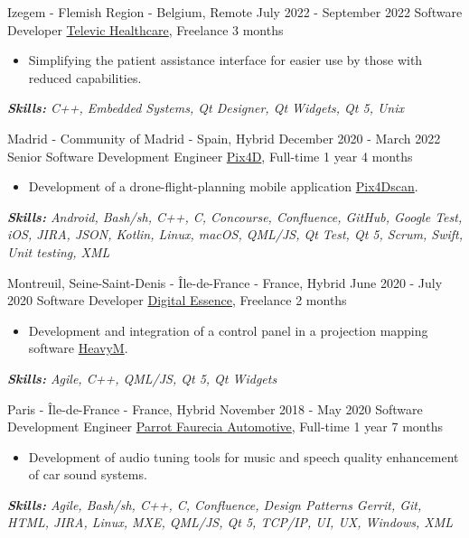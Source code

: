 \documentclass[11pt,a4paper,roman]{moderncv}
\begin{document}
\cventry
{Izegem - Flemish Region - Belgium, Remote}
{July 2022 - September 2022}
{Software Developer}
{\href{https://www.televic.com/en/healthcare}{Televic Healthcare}, Freelance}
{3 months}
{}
{
\begin{itemize}
	\item Simplifying the patient assistance interface for easier use by those with reduced capabilities.
\end{itemize}
{\textcolor{color2}{\textit{\textbf{Skills:}
	C++,
	Embedded Systems,
	Qt Designer,
	Qt Widgets,
	Qt 5,
	Unix
	\newline
}}}}


\cventry
{Madrid - Community of Madrid - Spain, Hybrid}
{December 2020 - March 2022}
{Senior Software Development Engineer}
{\href{https://www.pix4d.com}{Pix4D}, Full-time}
{1 year 4 months}
{}
{
\begin{itemize}
	\item Development of a drone-flight-planning mobile application \href{https://www.pix4d.com/es/producto/pix4dscan}{Pix4Dscan}.
\end{itemize}
{\textcolor{color2}{\textit{\textbf{Skills:}
	Android,
	Bash/sh,
	C++,
	C,
	Concourse,
	Confluence,
	GitHub,
	Google Test,
	iOS,
	JIRA,
	JSON,
	Kotlin,
	Linux,
	macOS,
	QML/JS,
	Qt Test,
	Qt 5,
	Scrum,
	Swift,
	Unit testing,
	XML
	\newline
}}}}


\cventry
{Montreuil, Seine-Saint-Denis - Île-de-France - France, Hybrid}
{June 2020 - July 2020}
{Software Developer}
{\href{https://digitalessence.fr/en/}{Digital Essence}, Freelance}
{2 months}
{}
{
\begin{itemize}
\item Development and integration of a control panel in a projection mapping software \href{https://www.heavym.net}{HeavyM}.
\end{itemize}
{\textcolor{color2}{\textit{\textbf{Skills:}
	Agile,
	C++,
	QML/JS,
	Qt 5,
	Qt Widgets
	\newline
}}}}


\cventry
{Paris - Île-de-France - France, Hybrid}
{November 2018 - May 2020}
{Software Development Engineer}
{\href{https://www.faurecia-clarion.com}{Parrot Faurecia Automotive}, Full-time}
{1 year 7 months}
{}
{
\begin{itemize}
\item Development of audio tuning tools for music and speech quality enhancement of car sound systems.
\end{itemize}
{\textcolor{color2}{\textit{\textbf{Skills:}
	Agile,
	Bash/sh,
	C++,
	C,
	Confluence,
	Design Patterns
	Gerrit,
	Git,
	HTML,
	JIRA,
	Linux,
	MXE,
	QML/JS,
	Qt 5,
	TCP/IP,
	UI,
	UX,
	Windows,
	XML
	\newline
}}}}
\end{document}
